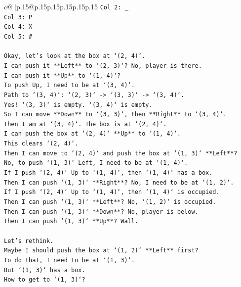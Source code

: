 \documentclass{article}
\begin{document}
{\begin{supertabular}{c@{$\;$}|p{.15\linewidth}@{}p{.15\linewidth}p{.15\linewidth}p{.15\linewidth}p{.15\linewidth}p{.15\linewidth}}
{{{\texttt{Col 2: \_} \\
\texttt{Col 3: P} \\
\texttt{Col 4: X} \\
\texttt{Col 5: \#} \\
\\ 
\texttt{Okay, let's look at the box at `(2, 4)`.} \\
\texttt{I can push it **Left** to `(2, 3)`? No, player is there.} \\
\texttt{I can push it **Up** to `(1, 4)`?} \\
\texttt{To push Up, I need to be at `(3, 4)`.} \\
\texttt{Path to `(3, 4)`: `(2, 3)` {-}> `(3, 3)` {-}> `(3, 4)`.} \\
\texttt{Yes! `(3, 3)` is empty. `(3, 4)` is empty.} \\
\texttt{So I can move **Down** to `(3, 3)`, then **Right** to `(3, 4)`.} \\
\texttt{Then I am at `(3, 4)`. The box is at `(2, 4)`.} \\
\texttt{I can push the box at `(2, 4)` **Up** to `(1, 4)`.} \\
\texttt{This clears `(2, 4)`.} \\
\texttt{Then I can move to `(2, 4)` and push the box at `(1, 3)` **Left**?} \\
\texttt{No, to push `(1, 3)` Left, I need to be at `(1, 4)`.} \\
\texttt{If I push `(2, 4)` Up to `(1, 4)`, then `(1, 4)` has a box.} \\
\texttt{Then I can push `(1, 3)` **Right**? No, I need to be at `(1, 2)`.} \\
\texttt{If I push `(2, 4)` Up to `(1, 4)`, then `(1, 4)` is occupied.} \\
\texttt{Then I can push `(1, 3)` **Left**? No, `(1, 2)` is occupied.} \\
\texttt{Then I can push `(1, 3)` **Down**? No, player is below.} \\
\texttt{Then I can push `(1, 3)` **Up**? Wall.} \\
\\ 
\texttt{Let's rethink.} \\
\texttt{Maybe I should push the box at `(1, 2)` **Left** first?} \\
\texttt{To do that, I need to be at `(1, 3)`.} \\
\texttt{But `(1, 3)` has a box.} \\
\texttt{How to get to `(1, 3)`?} \\
}}}
\end{supertabular}}
\end{document}
